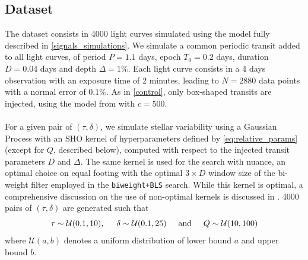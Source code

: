 \documentclass{aastex631}
\newcommand{\wtls}{\texttt{biweight+BLS}}
\begin{document}
\subsection{Dataset}\label{sim_dataset}
The dataset consists in 4000 light curves simulated using the model fully described in \autoref{signals_simulations}. We simulate a common periodic transit added to all light curves, of period $P=1.1$ days, epoch $T_0=0.2$ days, duration $D=0.04$ days and depth $\Delta=1\%$. Each light curve consists in a 4 days observation with an exposure time of 2 minutes, leading to $N=2880$ data points with a normal error of $0.1\%$. As in \autoref{control}, only box-shaped transits are injected, using the model from \cite{protopapas} with $c=500$.
\\\\
For a given pair of $(\tau, \delta)$, we simulate stellar variability using a Gaussian Process with an SHO kernel of hyperparameters defined by \autoref{eq:relative_params} (except for $Q$, described below), computed with respect to the injected transit parameters $D$ and $\Delta$. The same kernel is used for the search with \textsf{nuance}, an optimal choice on equal footing with the optimal $3\times D$ window size of the bi-weight filter employed in the \wtls{} search. While this kernel is optimal, a comprehensive discussion on the use of non-optimal kernels is discussed in . 4000 pairs of $(\tau, \delta)$ are generated such that
\begin{equation*}
    \tau \sim \mathcal{U}(0.1, 10), \hspace{0.5cm} \delta \sim \mathcal{U}(0.1, 25) \hspace{0.5cm}\text{and}\hspace{0.5cm} Q \sim \mathcal{U}(10, 100)
\end{equation*}
where $\mathcal{U}(a, b)$ denotes a uniform distribution of lower bound $a$ and upper bound $b$.
\end{document}
